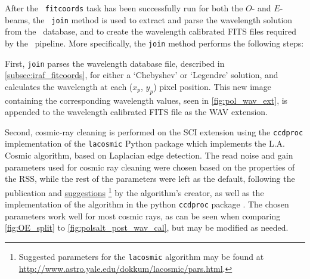 After the \iraf\ \texttt{fitcoords} task has been successfully run for both the $O$- and $E$-beams, the \stops\ \texttt{join} method is used to extract and parse the wavelength solution from the \iraf\ database, and to create the wavelength calibrated \gls{FITS} files required by the \polsalt\ pipeline. More specifically, the \texttt{join} method performs the following steps:

First, \texttt{join} parses the wavelength database file, described in \autoref{subsec:iraf_fitcoords}, for either a `Chebyshev' or `Legendre' solution, and calculates the wavelength at each ($x_{p}$, $y_{p}$) pixel position. This new image containing the corresponding wavelength values, seen in \autoref{fig:pol_wav_ext}, is appended to the wavelength calibrated \gls{FITS} file as the \gls{WAV} extension.

\pagebreak

Second, cosmic-ray cleaning is performed on the \gls{SCI} extension using the \texttt{ccdproc} implementation of the \texttt{lacosmic} Python package which implements the L.A. Cosmic algorithm, based on Laplacian edge detection. The read noise and gain parameters used for cosmic ray cleaning were chosen based on the properties of the \gls{RSS}, while the rest of the parameters were left as the default, following the publication and \href{http://www.astro.yale.edu/dokkum/lacosmic/pars.html}{suggestions}%
\footnote{Suggested parameters for the \texttt{lacosmic} algorithm may be found at \url{http://www.astro.yale.edu/dokkum/lacosmic/pars.html}.}
by the algorithm's creator, as well as the implementation of the algorithm in the python \texttt{ccdproc} package \citep{lacosmic,astroscrappy}. The chosen parameters work well for most cosmic rays, as can be seen when comparing \autoref{fig:OE_split} to \autoref{fig:polsalt_post_wav_cal}, but may be modified as needed.

